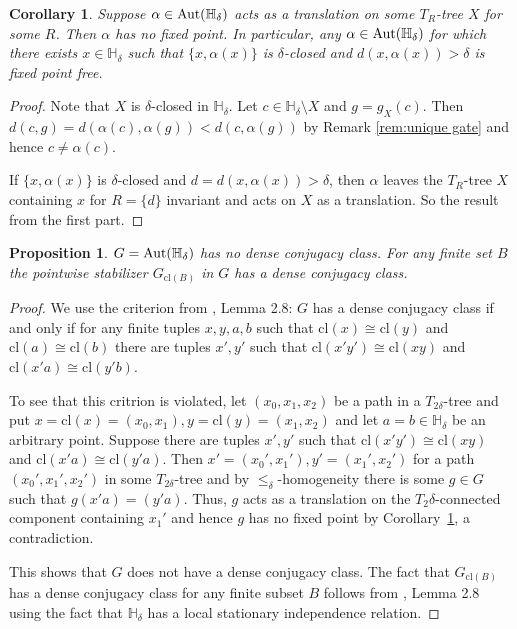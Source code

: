 \documentclass{amsart}
\renewcommand{\d}{\delta}
\renewcommand{\a}{\alpha}
\renewcommand{\H}{\mathbb{H}}
\newcommand{\cl}{\mathrm{cl}}
\newtheorem{proposition}[defi]{Proposition}
\newtheorem{corollary}[defi]{Corollary}
\def\Aut{\mathop{\rm Aut}\nolimits}
\begin{document}
\begin{corollary}\label{cor:no fixed point}
Suppose $\a\in\Aut(\H_\d)$ acts as a translation on some $T_R$-tree $X$ for some $R$.  Then $\a$ has no fixed point. In particular, any $\a\in\Aut(\H_\d)$ for which there exists $x\in\H_\d$ such that $\{x,\a(x)\}$ is   $\d$-closed and $d(x,\a(x))>\d$ is fixed point free.
\end{corollary}
\begin{proof}
 Note that $X$ is   $\d$-closed in $\H_\d$. Let $c\in\H_\d\setminus X$ and $g=g_X(c)$. Then $d(c,g)=d(\a(c),\a(g))<d(c,\a(g))$ by Remark \ref{rem:unique gate} and hence $c\neq\a(c)$.

If $\{x,\a(x)\}$ is   $\d$-closed and $d=d(x,\a(x))>\d$, then $\a$ leaves the $T_R$-tree $X$  containing $x$ for $R=\{d\}$ invariant and acts on $X$ as a translation. So the result from the first part.
\end{proof}


\begin{proposition}\label{prop:not dense}
$G=\Aut(\H_\d)$ has no dense conjugacy class.
For any finite set $B$ the pointwise stabilizer $G_{\cl(B)}$ in $G$ has a dense conjugacy class.
\end{proposition}
\begin{proof}
We use the criterion from  \cite{TZ}, Lemma 2.8: $G$ has a dense conjugacy class if and only if for any finite tuples $x, y, a, b$ such that $\cl(x)\cong\cl(y)$  and $\cl(a)\cong\cl(b)$ there are tuples $x',y'$ such that $\cl(x'y')\cong\cl(xy)$ and $\cl(x'a)\cong\cl(y'b)$. 

To see that this critrion is violated, let $(x_0,x_1,x_2)$ be a path in a $T_{2\d}$-tree and put $x=\cl(x)=(x_0,x_1), y=\cl(y)=(x_1,x_2)$ and let $a=b\in\H_\d$ be an arbitrary point.
Suppose there are tuples $x',y'$ such that $\cl(x'y')\cong\cl(xy)$ and $\cl(x'a)\cong\cl(y'a)$. Then $x'=(x_0',x_1'), y'=(x_1',x_2')$ for a path
  $(x_0',x_1',x_2')$ in some $T_{2\d}$-tree and by $\leq_\d$-homogeneity there is some $g\in G$ such that $g(x'a)=(y'a)$. Thus, $g$ acts as a translation on the $T_2\d$-connected component containing $x_1'$ and hence $g$ has no fixed point by Corollary~\ref{cor:no fixed point}, a contradiction. 
  
  This shows that $G$ does not have a dense conjugacy class. The fact that  $G_{\cl(B)}$  has a dense conjugacy class for any finite subset $B$ follows from \cite{TZ}, Lemma 2.8 using the fact that $\H_\d$ has a local stationary independence relation.

\end{proof}
\end{document}
